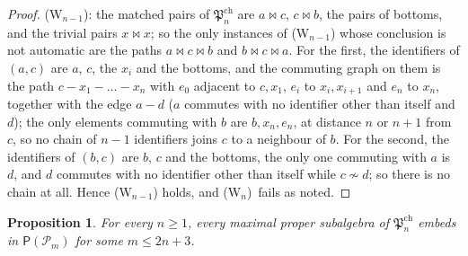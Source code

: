 \documentclass[11pt]{amsart}
\newtheorem{proposition}[theorem]{Proposition}
\theoremstyle{definition}
\renewcommand{\P}{\mathcal{P}}      %
\newcommand{\PA}{\mathsf{P}}         %
\newcommand{\mt}{\bowtie}      %
\newcommand{\Wn}[1][n]{\textup{(W$_{#1}$)}}
\begin{document}
\begin{proof}
\Wn[n-1]: the matched pairs of $\mathfrak P^{\mathrm{ch}}_n$ are $a\mt c$, $c\mt b$, the pairs of bottoms, and the trivial pairs $x\mt x$; so the only instances of \Wn[n-1] whose conclusion is not automatic are the paths $a\mt c\mt b$ and $b\mt c\mt a$. For the first, the identifiers of $(a,c)$ are $a$, $c$, the $x_i$ and the bottoms, and the commuting graph on them is the path $c-x_1-\dots-x_n$ with $e_0$ adjacent to $c,x_1$, $e_i$ to $x_i,x_{i+1}$ and $e_n$ to $x_n$, together with the edge $a-d$ ($a$ commutes with no identifier other than itself and $d$); the only elements commuting with $b$ are $b,x_n,e_n$, at distance $n$ or $n+1$ from $c$, so no chain of $n-1$ identifiers joins $c$ to a neighbour of $b$. For the second, the identifiers of $(b,c)$ are $b$, $c$ and the bottoms, the only one commuting with $a$ is $d$, and $d$ commutes with no identifier other than itself while $c\not\sim d$; so there is no chain at all. Hence \Wn[n-1] holds, and \Wn\ fails as noted.
\end{proof}

\begin{proposition}\label{prop:maxsub}
For every $n\ge1$, every maximal proper subalgebra of $\mathfrak P^{\mathrm{ch}}_n$ embeds in $\PA(\P_m)$ for some $m\le2n+3$.
\end{proposition}
\end{document}
